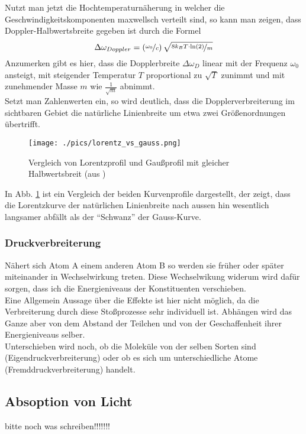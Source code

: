 \documentclass[a4paper,oneside]{article}
\begin{document}
Nutzt man jetzt die Hochtemperaturnäherung in welcher die Geschwindigkeitskomponenten maxwellsch verteilt sind, so kann man zeigen, dass Doppler-Halbwertsbreite gegeben ist durch die Formel
\begin{equation}
 \Delta \omega_{Doppler}=\left(\nicefrac{\omega_0}{c}\right)\sqrt{\nicefrac{8k_B T\cdot \ln(2)}{m}}
 \label{Doppler}
\end{equation}
Anzumerken gibt es hier, dass die Dopplerbreite $\Delta\omega_D$ linear mit der Frequenz $\omega_0$ ansteigt, mit steigender Temperatur $T$ proportional zu $\sqrt{T}$ zunimmt und mit zunehmender Masse $m$ wie $\frac{1}{\sqrt{m}}$ abnimmt.\\
Setzt man Zahlenwerten ein, so wird deutlich, dass die Dopplerverbreiterung im sichtbaren Gebiet die natürliche Linienbreite um etwa zwei Größenordnungen übertrifft.


\begin{figure}
 \centering
 \texttt{[image: ./pics/lorentz\_vs\_gauss.png]}
 \caption[Gaus-und Lorentzkurve (aus \cite{dem3})]{Vergleich von Lorentzprofil und Gaußprofil mit gleicher Halbwertsbreit (aus \cite{dem3})}
 \label{lorentz_gauss}
\end{figure}

In Abb. \ref{lorentz_gauss} ist ein Vergleich der beiden Kurvenprofile dargestellt, der zeigt, dass die Lorentzkurve der natürlichen Linienbreite nach aussen hin wesentlich langsamer abfällt als der ``Schwanz'' der Gauss-Kurve.


\subsubsection{Druckverbreiterung}
Nähert sich Atom A einem anderen Atom B so werden sie früher oder später miteinander in Wechselwirkung treten. Diese Wechselwikung widerum wird dafür sorgen, dass ich die Energieniveaus der Konstituenten verschieben.\\
Eine Allgemein Aussage über die Effekte ist hier nicht möglich, da die Verbreiterung durch diese Stoßprozesse sehr individuell ist. Abhängen wird das Ganze aber von dem Abstand der Teilchen und von der Geschaffenheit ihrer Energieniveaus selber.\\
Unterschieben wird noch, ob die Moleküle von der selben Sorten sind (Eigendruckverbreiterung) oder ob es sich um unterschiedliche Atome (Fremddruckverbreiterung) handelt.

\subsection{Absoption von Licht}
bitte noch was schreiben!!!!!!!
\end{document}
